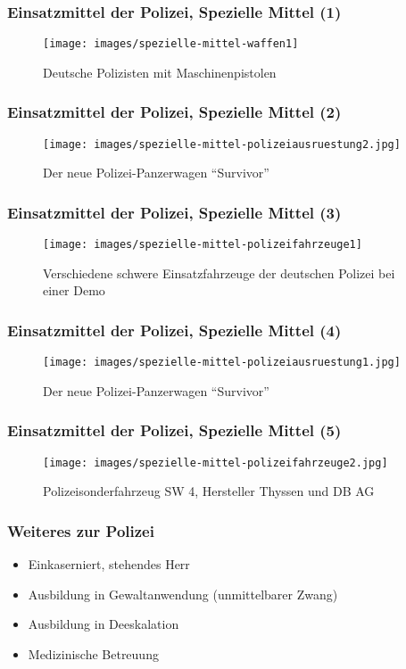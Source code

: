 \documentclass[]{beamer}
\begin{document}
	\begin{frame}
	\frametitle{Einsatzmittel der Polizei, Spezielle Mittel (1) }
	\begin{figure}[h!]
		\renewcommand{\figurename}{Foto} 
		\texttt{[image: images/spezielle-mittel-waffen1]}
		\caption{Deutsche Polizisten mit Maschinenpistolen}
	\end{figure}
\end{frame}	

	\begin{frame}
	\frametitle{Einsatzmittel der Polizei, Spezielle Mittel (2) }
	\begin{figure}[h!]
		\renewcommand{\figurename}{Foto} 
		\texttt{[image: images/spezielle-mittel-polizeiausruestung2.jpg]}
		\caption{Der neue Polizei-Panzerwagen \enquote{Survivor}}
	\end{figure}
	\end{frame}

	\begin{frame}
	\frametitle{Einsatzmittel der Polizei, Spezielle Mittel (3) }
	\begin{figure}[h!]
		\renewcommand{\figurename}{Foto} 
		\texttt{[image: images/spezielle-mittel-polizeifahrzeuge1]}
		\caption{Verschiedene schwere Einsatzfahrzeuge der deutschen Polizei bei einer Demo}
	\end{figure}
	\end{frame}

	\begin{frame}
	\frametitle{Einsatzmittel der Polizei, Spezielle Mittel (4)}
	\begin{figure}[h!]
		\renewcommand{\figurename}{Foto} 
		\texttt{[image: images/spezielle-mittel-polizeiausruestung1.jpg]}
		\caption{Der neue Polizei-Panzerwagen \enquote{Survivor}}
	\end{figure}
	\end{frame}

	\begin{frame}
	\frametitle{Einsatzmittel der Polizei, Spezielle Mittel (5)}
	\begin{figure}[h!]
		\renewcommand{\figurename}{Foto} 
		\texttt{[image: images/spezielle-mittel-polizeifahrzeuge2.jpg]}
		\caption{Polizeisonderfahrzeug SW 4, Hersteller Thyssen und DB AG}
	\end{figure}
	\end{frame}

	\begin{frame}
	\frametitle{Weiteres zur Polizei}
	\begin{itemize}
		\item Einkaserniert, stehendes Herr
		\item Ausbildung in Gewaltanwendung (unmittelbarer Zwang)
		\item Ausbildung in Deeskalation
		\item Medizinische Betreuung
	\end{itemize}
	\end{frame}
\end{document}
